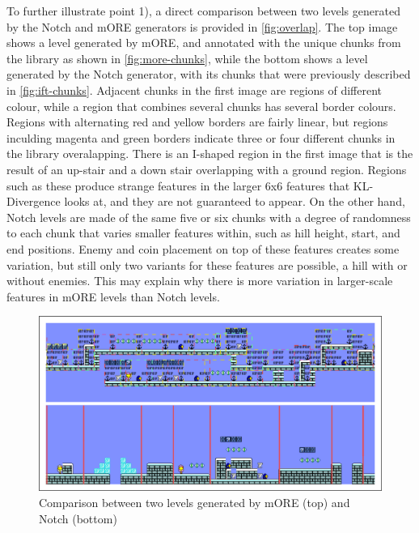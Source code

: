 To further illustrate point 1), a direct comparison between two levels generated by the
Notch and mORE generators is provided in \autoref{fig:overlap}. The top image shows a level
generated by mORE, and annotated with the unique chunks from the library as shown in \autoref{fig:more-chunks},
while the bottom shows a level generated by the Notch generator, with its chunks that were
previously described in \autoref{fig:ift-chunks}. Adjacent chunks in the first image are
regions of different colour, while a region that combines several chunks has several border
colours. Regions with alternating red and yellow borders are fairly linear, but regions
inculding magenta and green borders indicate three or four different chunks in the library
overalapping. There is an I-shaped region in the first image that is the result of an up-stair
and a down stair overlapping with a ground region. Regions such as these produce strange
features in the larger 6x6 features that KL-Divergence looks at, and they are not
guaranteed to appear. On the other hand, Notch levels are made of the same five or six chunks
with a degree of randomness to each chunk that varies smaller features within, such as hill
height, start, and end positions. Enemy and coin placement on top of these features creates
some variation, but still only two variants for these features are possible, a hill with or
without enemies. This may explain why there is more variation in larger-scale features in
mORE levels than Notch levels.

\begin{figure}[ht]
    \centering
    \includegraphics[width=\linewidth]{img/fig17-overlap.png}
    \caption{Comparison between two levels generated by mORE (top) and Notch (bottom)}
    \label{fig:overlap}
\end{figure}

